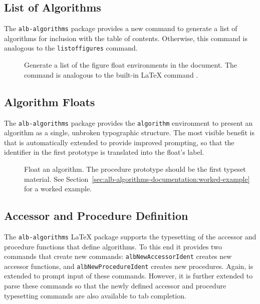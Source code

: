 \documentclass[11pt,a4paper,oneside,titlepage]{alb-corp}
\begin{document}
\subsection{List of Algorithms}
\label{sec:alb-algorithms-documentation:list-algor}

The \texttt{alb-algorithms} package provides a new command to generate a
list of algorithms for inclusion with the table of contents.  Otherwise,
this command is analogous to the \texttt{listoffigures} command.

\begin{description}
\item[] Generate a list of the figure float
  environments in the document.  The command is analogous to the
  built-in LaTeX command .
\end{description}



\subsection{Algorithm Floats}
\label{sec:alb-algorithms-documentation:algor-floats}

The \texttt{alb-algorithms} package provides the \texttt{algorithm}
environment to present an algorithm as a single, unbroken typographic
structure.  The most visible benefit is that \AUCTeX{} is automatically
extended to provide improved prompting, so that the identifier in the
first prototype is translated into the float's label.

\begin{description}
\item[] Float an algorithm.  The procedure
  prototype should be the first typeset material.  See
  Section~\ref{sec:alb-algorithms-documentation:worked-example} for a
  worked example.
\end{description}



\subsection{Accessor and Procedure Definition}
\label{sec:alb-algorithms-documentation:accessor-proc-defin}

The \texttt{alb-algorithms} \LaTeX{} package supports the typesetting of
the accessor and procedure functions that define algorithms.  To this
end it provides two commands that create new commands:
\texttt{albNewAccessorIdent} creates new accessor functions, and
\texttt{albNewProcedureIdent} creates new procedures.  Again, \AUCTeX{}
is extended to prompt input of these commands.  However, it is further
extended to parse these commands so that the newly defined accessor and
procedure typesetting commands are also available to tab completion.
\end{document}
